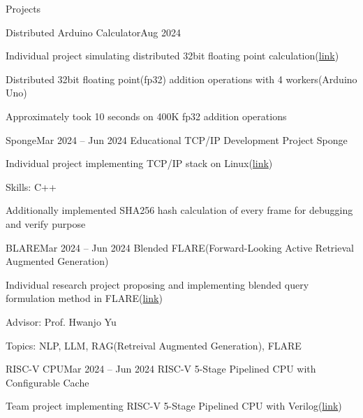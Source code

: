 \documentclass{resume}
\begin{document}
\begin{rSection}{Projects}
\begin{rSubsection}{Distributed Arduino Calculator}{Aug 2024}
        \item Individual project simulating distributed 32bit floating point calculation(\href{https://github.com/minsusun/kakashi/tree/main/avr/arduino/i2c-distributed-floating-point-calculator}{link})

        \item Distributed 32bit floating point(fp32) addition operations with 4 workers(Arduino Uno)

        \item Approximately took 10 seconds on 400K fp32 addition operations
    \end{rSubsection}

    \begin{rSubsection}{Sponge}{Mar 2024 -- Jun 2024}
        Educational TCP/IP Development Project Sponge

        \item Individual project implementing TCP/IP stack on Linux(\href{https://github.com/minsusun/csed353-sponge}{link})

        \item Skills: C++

        \item Additionally implemented SHA256 hash calculation of every frame for debugging and verify purpose
    \end{rSubsection}

    \begin{rSubsection}{BLARE}{Mar 2024 -- Jun 2024}
        Blended FLARE(Forward-Looking Active Retrieval Augmented Generation)

        \item Individual research project proposing and implementing blended query formulation method in FLARE(\href{https://github.com/minsusun/BLARE}{link})

        \item Advisor: Prof. Hwanjo Yu

        \item Topics: NLP, LLM, RAG(Retreival Augmented Generation), FLARE
    \end{rSubsection}

    \begin{rSubsection}{RISC-V CPU}{Mar 2024 -- Jun 2024}
        RISC-V 5-Stage Pipelined CPU with Configurable Cache

        \item Team project implementing RISC-V 5-Stage Pipelined CPU with Verilog(\href{https://github.com/minsusun/csed311/tree/main/lab5}{link})


\end{rSubsection}
\end{rSection}
\end{document}
